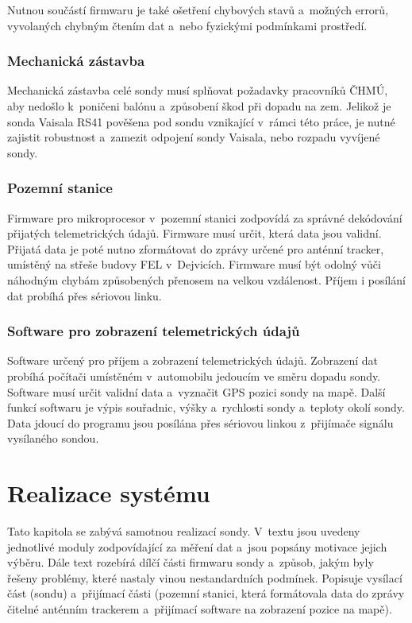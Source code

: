 \documentclass[twoside]{ctuthesis}
\theoremstyle{plain}
\theoremstyle{definition}
\theoremstyle{note}
\begin{document}
		Nutnou součástí firmwaru je také ošetření chybových stavů a~možných errorů, vyvolaných chybným čtením dat a~nebo fyzickými podmínkami prostředí.

		\subsection{Mechanická zástavba}
		Mechanická zástavba celé sondy musí splňovat požadavky pracovníků ČHMÚ, aby nedošlo k~poničeni balónu a~způsobení škod při dopadu na zem. Jelikož je sonda Vaisala RS41 pověšena pod sondu vznikající v~rámci této práce, je nutné zajistit robustnost a~zamezit odpojení sondy Vaisala, nebo rozpadu vyvíjené sondy.



		\subsection{Pozemní stanice}
		\label{sec:navrh:pozemni_stanice}
		Firmware pro mikroprocesor v~pozemní stanici zodpovídá za správné dekódování přijatých telemetrických údajů. Firmware musí určit, která data jsou validní. Přijatá data je poté nutno zformátovat do zprávy určené pro anténní tracker, umístěný na střeše budovy FEL v~Dejvicích. Firmware musí být odolný vůči náhodným chybám způsobených přenosem na velkou vzdálenost. Příjem i posílání dat probíhá přes sériovou linku. 



		\subsection{Software pro zobrazení telemetrických údajů}
		Software určený pro příjem a zobrazení telemetrických údajů. Zobrazení dat probíhá počítači umístěném v~automobilu jedoucím ve směru dopadu sondy. Software musí určit validní data a~vyznačit GPS pozici sondy na mapě. Další funkcí softwaru je výpis souřadnic, výšky a~rychlosti sondy a~teploty okolí sondy. Data jdoucí do programu jsou posílána přes sériovou linkou z~přijímače signálu vysílaného sondou. 




\chapter{Realizace systému}
Tato kapitola se zabývá samotnou realizací sondy. V~textu jsou uvedeny jednotlivé moduly zodpovídající za měření dat a~jsou popsány motivace jejich výběru. Dále text rozebírá dílčí části firmwaru sondy a~způsob, jakým byly řešeny problémy, které nastaly vinou nestandardních podmínek. Popisuje vysílací část (sondu) a~přijímací části (pozemní stanici, která formátovala data do zprávy čitelné anténním trackerem a~přijímací software na zobrazení pozice na mapě). 
\end{document}
